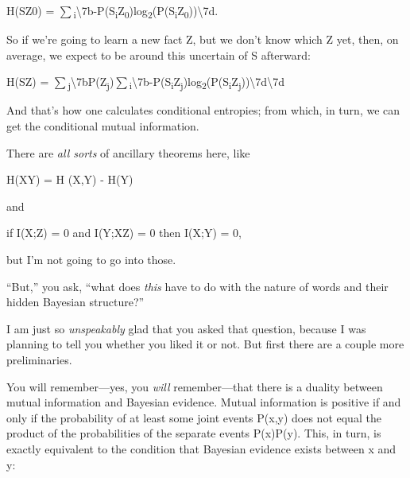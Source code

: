 {\centering
 H(S{\textbar}Z0) =
${\sum}$\textsubscript{i}{\textbackslash}{\textquotesingle}7b-P(S\textsubscript{i}{\textbar}Z\textsubscript{0})log\textsubscript{2}(P(S\textsubscript{i}{\textbar}Z\textsubscript{0})){\textbackslash}{\textquotesingle}7d.
\par}


\bigskip

{
 So if we're going to learn a new fact Z, but we
don't know which Z yet, then, on average, we expect to
be around this uncertain of S afterward:}

{\centering
 H(S{\textbar}Z) =
${\sum}$\textsubscript{j}{\textbackslash}{\textquotesingle}7bP(Z\textsubscript{j})${\sum}$\textsubscript{i}{\textbackslash}{\textquotesingle}7b-P(S\textsubscript{i}{\textbar}Z\textsubscript{j})log\textsubscript{2}(P(S\textsubscript{i}{\textbar}Z\textsubscript{j})){\textbackslash}{\textquotesingle}7d{\textbackslash}{\textquotesingle}7d
\par}


\bigskip

{
 And that's how one calculates conditional
entropies; from which, in turn, we can get the conditional mutual
information. }

{
 There are \textit{all sorts} of ancillary theorems here, like}

{\centering
 H(X{\textbar}Y) = H (X,Y) - H(Y)
\par}


\bigskip

{
 and}

{\centering
 if I(X;Z) = 0 and I(Y;X{\textbar}Z) = 0 then I(X;Y) = 0,
\par}


\bigskip

{
 but I'm not going to go into those. }

{
 ``But,'' you ask,
``what does \textit{this} have to do with the nature
of words and their hidden Bayesian structure?''}

{
 I am just so \textit{unspeakably} glad that you asked that
question, because I was planning to tell you whether you liked it or
not. But first there are a couple more preliminaries.}

{
 You will remember---yes, you \textit{will} remember---that there
is a duality between mutual information and Bayesian evidence. Mutual
information is positive if and only if the probability of at least some
joint events P(x,y) does not equal the product of the probabilities of
the separate events P(x)P(y). This, in turn, is exactly equivalent to
the condition that Bayesian evidence exists between x and y:}

